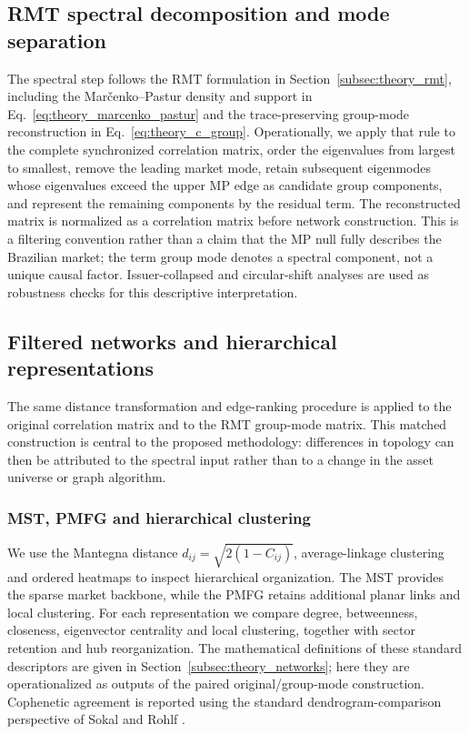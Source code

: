 \subsection{RMT spectral decomposition and mode separation}
\label{subsec:rmt_method}

The spectral step follows the RMT formulation in Section~\ref{subsec:theory_rmt}, including the Mar\v{c}enko--Pastur density and support in Eq.~\eqref{eq:theory_marcenko_pastur} and the trace-preserving group-mode reconstruction in Eq.~\eqref{eq:theory_c_group}. Operationally, we apply that rule to the complete synchronized correlation matrix, order the eigenvalues from largest to smallest, remove the leading market mode, retain subsequent eigenmodes whose eigenvalues exceed the upper MP edge as candidate group components, and represent the remaining components by the residual term. The reconstructed matrix is normalized as a correlation matrix before network construction. This is a filtering convention rather than a claim that the MP null fully describes the Brazilian market; the term group mode denotes a spectral component, not a unique causal factor. Issuer-collapsed and circular-shift analyses are used as robustness checks for this descriptive interpretation.

\subsection{Filtered networks and hierarchical representations}
\label{subsec:network_method}

The same distance transformation and edge-ranking procedure is applied to the original correlation matrix and to the RMT group-mode matrix. This matched construction is central to the proposed methodology: differences in topology can then be attributed to the spectral input rather than to a change in the asset universe or graph algorithm.

\subsubsection{MST, PMFG and hierarchical clustering}
\label{subsec:distance_clustering_method}

We use the Mantegna distance $d_{ij}=\sqrt{2(1-C_{ij})}$, average-linkage clustering and ordered heatmaps to inspect hierarchical organization. The MST provides the sparse market backbone, while the PMFG retains additional planar links and local clustering. For each representation we compare degree, betweenness, closeness, eigenvector centrality and local clustering, together with sector retention and hub reorganization. The mathematical definitions of these standard descriptors are given in Section~\ref{subsec:theory_networks}; here they are operationalized as outputs of the paired original/group-mode construction. Cophenetic agreement is reported using the standard dendrogram-comparison perspective of Sokal and Rohlf \cite{sokal_rohlf_1962}.


